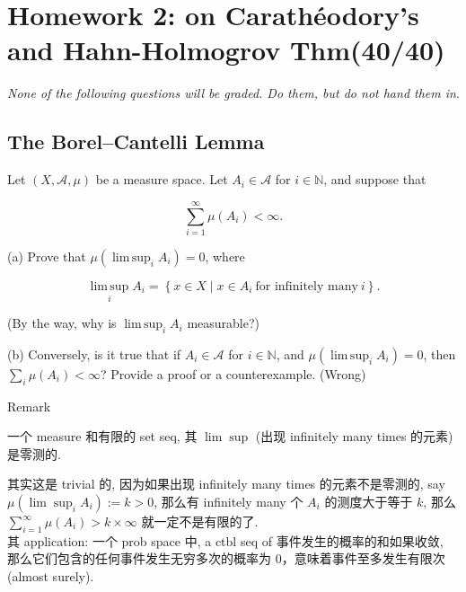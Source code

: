 \chapter{Homework 2: on Carathéodory's and Hahn-Holmogrov Thm(40/40)}\label{homework-2-on-carathuxe9odorys-and-hahn-holmogrov-thm4040}

\emph{None of the following questions will be graded. Do them, but do not hand them in}.

\section{The Borel--Cantelli Lemma}\label{the-borelcantelli-lemma}

Let \((X,\mathcal{A},\mu)\) be a measure space. Let \(A_{i} \in \mathcal{A}\) for \(i \in \mathbb{N}\), and suppose that

\[\sum\limits_{i = 1}^{\infty}\mu(A_{i}) < \infty.\]

(a) Prove that \(\mu(\operatorname{lim\, sup}_{i}A_{i}) = 0\), where

\[\operatorname{lim\, sup}\limits_{i}A_{i} = \left\{ {x \in X \mid x \in A_{i}\ \text{for infinitely many}\ i} \right\}.\]

(By the way, why is \(\operatorname{lim\, sup}_{i}A_{i}\) measurable?)

(b) Conversely, is it true that if \(A_{i} \in \mathcal{A}\) for \(i \in \mathbb{N}\), and \(\mu(\operatorname{lim\, sup}_{i}A_{i}) = 0\), then \(\sum_{i}\mu(A_{i}) < \infty\)? Provide a proof or a counterexample. (Wrong)

\begin{qlremark}{Remark}

\begin{theorem}{}

一个 measure 和有限的 set seq, 其 \(\lim\sup\) (出现 infinitely many times 的元素) 是零测的.

\end{theorem}

其实这是 trivial 的, 因为如果出现 infinitely many times 的元素不是零测的, say \(\mu(\lim\sup_{i}A_{i}) := k > 0\), 那么有 infinitely many 个 \(A_{i}\) 的测度大于等于 \(k\), 那么 \(\sum_{i = 1}^{\infty}\mu(A_{i}) > k \times \infty\) 就一定不是有限的了.\\
其 application: 一个 prob space 中, a ctbl seq of 事件发生的概率的和如果收敛, 那么它们包含的任何事件发生无穷多次的概率为 0，意味着事件至多发生有限次 (almost surely).

\end{qlremark}

